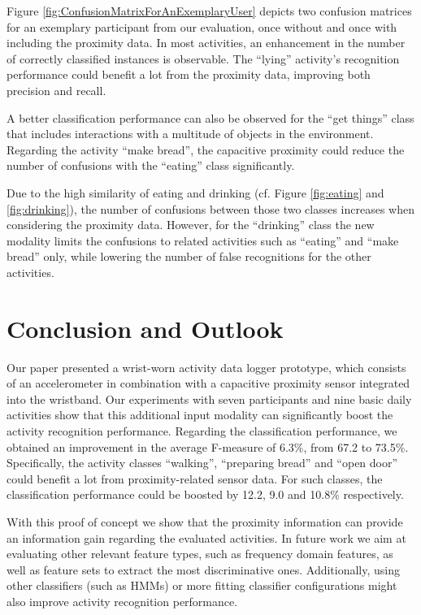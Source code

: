 \documentclass[runningheads,a4paper]{llncs}
\begin{document}
Figure \ref{fig:ConfusionMatrixForAnExemplaryUser}  depicts two confusion matrices for an exemplary participant from our evaluation, once without and once with including the proximity data. In most activities, an enhancement in the number of correctly classified instances is observable. The ``lying'' activity's recognition performance could benefit a lot from the proximity data, improving both precision and recall. 

A better classification performance can also be observed for the ``get things'' class that includes interactions with a multitude of objects in the environment. Regarding the activity ``make bread'', the capacitive proximity could reduce the number of confusions with the ``eating'' class significantly.

Due to the high similarity of eating and drinking (cf. Figure \ref{fig:eating} and \ref{fig:drinking}), the number of confusions between those two classes increases when considering the proximity data. However, for the ``drinking'' class the new modality limits the confusions to related activities such as ``eating'' and ``make bread'' only, while lowering the number of false recognitions for the other activities.

\section{Conclusion and Outlook}
\label{sect:conclusions}

Our paper presented a wrist-worn activity data logger prototype, which consists of an accelerometer in combination with a capacitive proximity sensor integrated into the wristband. Our experiments with seven participants and nine basic daily activities show that this additional input modality can significantly boost the activity recognition performance.
Regarding the classification performance, we obtained an improvement in the average F-measure of 6.3\%, from 67.2 to 73.5\%. Specifically, the activity classes ``walking'', ``preparing bread'' and ``open door'' could benefit a lot from proximity-related sensor data. For such classes, the classification performance could be boosted by 12.2, 9.0 and 10.8\% respectively. 

With this proof of concept we show that the proximity information can provide an information gain regarding the evaluated activities. In future work we aim at evaluating other relevant feature types, such as frequency domain features, as well as feature sets to extract the most discriminative ones. Additionally, using other classifiers (such as HMMs) or more fitting classifier configurations might also improve activity recognition performance.
\end{document}
